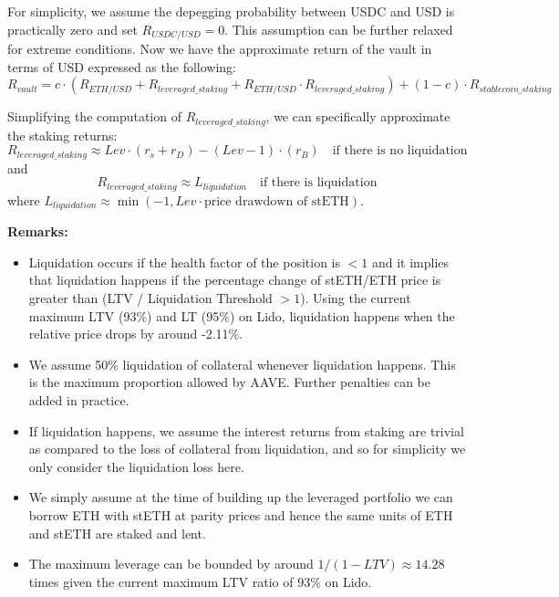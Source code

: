 \documentclass[11pt, a4paper]{article}
\begin{document}
For simplicity, we assume the depegging probability between USDC and USD is practically zero and set $R_{USDC/USD} = 0$. This assumption can be further relaxed for extreme conditions. Now we have the approximate return of the vault in terms of USD expressed as the following:
\begin{equation*}
    R_{vault} = c \cdot (R_{ETH/USD} + R_{leveraged\_staking} + R_{ETH/USD} \cdot R_{leveraged\_staking}) + (1 - c) \cdot R_{stablecoin\_staking}
\end{equation*}

Simplifying the computation of $R_{leveraged\_staking}$, we can specifically approximate the staking returns:
\begin{equation*}
    R_{leveraged\_staking} \approx Lev \cdot (r_s + r_D) - (Lev - 1) \cdot (r_B) \quad \text{if there is no liquidation}
\end{equation*}
and
\begin{equation*}
    R_{leveraged\_staking} \approx L_{liquidation} \quad \text{if there is liquidation}
\end{equation*}
where $L_{liquidation} \approx \min(-1, Lev \cdot \text{price drawdown of stETH})$.

\textbf{Remarks:}
\begin{itemize}
    \item Liquidation occurs if the health factor of the position is $< 1$ and it implies that liquidation happens if the percentage change of stETH/ETH price is greater than (LTV / Liquidation Threshold $> 1$). Using the current maximum LTV (93\%) and LT (95\%) on Lido, liquidation happens when the relative price drops by around -2.11\%.
    \item We assume 50\% liquidation of collateral whenever liquidation happens. This is the maximum proportion allowed by AAVE. Further penalties can be added in practice.
    \item If liquidation happens, we assume the interest returns from staking are trivial as compared to the loss of collateral from liquidation, and so for simplicity we only consider the liquidation loss here.
    \item We simply assume at the time of building up the leveraged portfolio we can borrow ETH with stETH at parity prices and hence the same units of ETH and stETH are staked and lent.
    \item The maximum leverage can be bounded by around $1/(1-LTV) \approx 14.28$ times given the current maximum LTV ratio of 93\% on Lido.
\end{itemize}
\end{document}
